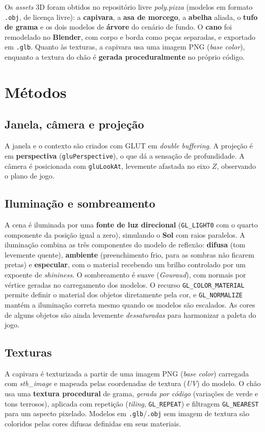 \documentclass[12pt]{article}
\begin{document}
Os \emph{assets} 3D foram obtidos no repositório livre \emph{poly.pizza}
(modelos em formato \texttt{.obj}, de licença livre): a \textbf{capivara},
a \textbf{asa de morcego}, a \textbf{abelha} aliada, o \textbf{tufo de
grama} e os dois modelos de \textbf{árvore} do cenário de fundo. O
\textbf{cano} foi remodelado no \textbf{Blender}, com corpo e borda como
peças separadas, e exportado em \texttt{.glb}. Quanto às texturas, a
capivara usa uma imagem PNG (\emph{base color}), enquanto a textura do chão
é \textbf{gerada proceduralmente} no próprio código.

\section{Métodos}

\subsection{Janela, câmera e projeção}
A janela e o contexto são criados com GLUT em \emph{double buffering}. A
projeção é em \textbf{perspectiva} (\texttt{gluPerspective}), o que dá a
sensação de profundidade. A câmera é posicionada com \texttt{gluLookAt},
levemente afastada no eixo $Z$, observando o plano de jogo.

\subsection{Iluminação e sombreamento}
A cena é iluminada por uma \textbf{fonte de luz direcional}
(\texttt{GL\_LIGHT0} com o quarto componente da posição igual a zero),
simulando o \textbf{Sol} com raios paralelos. A iluminação combina as três
componentes do modelo de reflexão: \textbf{difusa} (tom levemente quente),
\textbf{ambiente} (preenchimento frio, para as sombras não ficarem pretas) e
\textbf{especular}, com o material recebendo um brilho controlado por um
expoente de \emph{shininess}. O sombreamento é suave (\emph{Gouraud}), com
normais por vértice geradas no carregamento dos modelos. O recurso
\texttt{GL\_COLOR\_MATERIAL} permite definir o material dos objetos
diretamente pela cor, e \texttt{GL\_NORMALIZE} mantém a iluminação correta
mesmo quando os modelos são escalados. As cores de alguns objetos são ainda
levemente \emph{dessaturadas} para harmonizar a paleta do jogo.

\subsection{Texturas}
A capivara é texturizada a partir de uma imagem PNG (\emph{base color})
carregada com \emph{stb\_image} e mapeada pelas coordenadas de textura
(\emph{UV}) do modelo. O chão usa uma \textbf{textura procedural} de grama,
\emph{gerada por código} (variações de verde e tons terrosos), aplicada com
repetição (\emph{tiling}, \texttt{GL\_REPEAT}) e filtragem \texttt{GL\_NEAREST}
para um aspecto pixelado. Modelos em \texttt{.glb}/\texttt{.obj} sem imagem de
textura são coloridos pelas cores difusas definidas em seus materiais.
\end{document}
